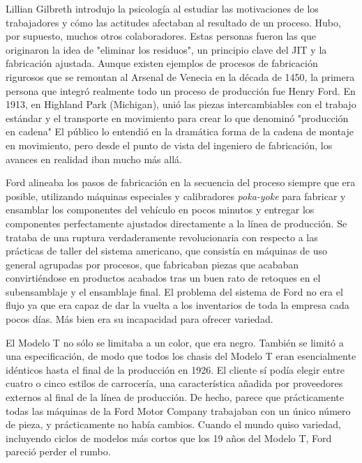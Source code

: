 Lillian Gilbreth introdujo la psicología al estudiar las motivaciones de los trabajadores y cómo las actitudes afectaban al resultado de un proceso.
Hubo, por supuesto, muchos otros colaboradores.
Estas personas fueron las que originaron la idea de "eliminar los residuos", un principio clave del JIT y la fabricación ajustada.
Aunque existen ejemplos de procesos de fabricación rigurosos que se remontan al Arsenal de Venecia en la década de 1450, la primera persona que integró realmente todo un proceso de producción fue Henry Ford.
En 1913, en Highland Park (Michigan), unió las piezas intercambiables con el trabajo estándar y el transporte en movimiento para crear lo que denominó "producción en cadena"
El público lo entendió en la dramática forma de la cadena de montaje en movimiento, pero desde el punto de vista del ingeniero de fabricación, los avances en realidad iban mucho más allá.

Ford alineaba los pasos de fabricación en la secuencia del proceso siempre que era posible, utilizando máquinas especiales y calibradores \textit{poka-yoke} para fabricar y ensamblar los componentes del vehículo en pocos minutos y entregar los componentes perfectamente ajustados directamente a la línea de producción.
Se trataba de una ruptura verdaderamente revolucionaria con respecto a las prácticas de taller del sistema americano, que consistía en máquinas de uso general agrupadas por procesos, que fabricaban piezas que acababan convirtiéndose en productos acabados tras un buen rato de retoques en el subensamblaje y el ensamblaje final.
El problema del sistema de Ford no era el flujo ya que era capaz de dar la vuelta a los inventarios de toda la empresa cada pocos días.
Más bien era su incapacidad para ofrecer variedad.

El Modelo T no sólo se limitaba a un color, que era negro. También se limitó a una especificación, de modo que todos los chasis del Modelo T eran esencialmente idénticos hasta el final de la producción en 1926.
El cliente sí podía elegir entre cuatro o cinco estilos de carrocería, una característica añadida por proveedores externos al final de la línea de producción.
De hecho, parece que prácticamente todas las máquinas de la Ford Motor Company trabajaban con un único número de pieza, y prácticamente no había cambios.
Cuando el mundo quiso variedad, incluyendo ciclos de modelos más cortos que los 19 años del Modelo T, Ford pareció perder el rumbo.

